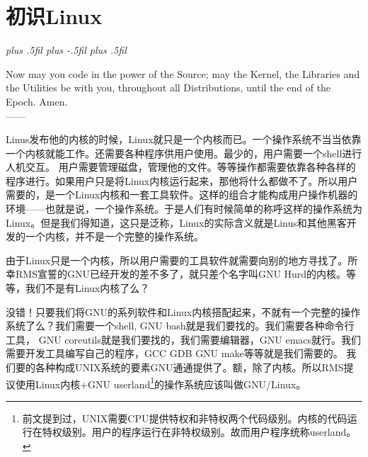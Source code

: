 \documentclass[amstex,twoside]{ctexbook}
\newcommand{\RTLpar}{%
  \leftskip=0pt plus .5fil%
  \rightskip=0pt plus -.5fil%
  \parfillskip=0pt plus .5fil%
}
\newenvironment{quotes}[2][0.55]{\pushQED{#2}%
\begin{flushright}%
\begin{minipage}{#1\textwidth}\begin{flushright}\noindent\it\RTLpar}{%
 \\------\popQED{}\end{flushright}\end{minipage}\end{flushright}\vskip 8mm }%
\begin{document}
{



}

\tableofcontents

\ifdefined\compileall
	
\else
	\addtocounter{chapter}{1}
\fi



\ifdefined\compileall

\else
\addtocounter{chapter}{1}
\fi 

\ifdefined\compileall

\else
\addtocounter{chapter}{1}
\fi 


\chapter{初识Linux}

\begin{quotes}[0.63]{The Gospel of Tux}
Now may you code in the power of the Source; may the Kernel, the Libraries and the Utilities be with you, throughout all Distributions, until the end of the Epoch. Amen. 
\end{quotes}

Linus发布他的内核的时候，Linux就只是一个内核而已。一个操作系统不当当依靠一个内核就能工作。还需要各种程序供用户使用。最少的，用户需要一个shell进行人机交互。
用户需要管理磁盘，管理他的文件。等等操作都需要依靠各种各样的程序进行。如果用户只是将Linux内核运行起来，那他将什么都做不了。所以用户需要的，是一个Linux内核和一套工具软件。这样的组合才能构成用户操作机器的环境——也就是说，一个操作系统。于是人们有时候简单的称呼这样的操作系统为Linux。但是我们得知道，这只是泛称，Linux的实际含义就是Linus和其他黑客开发的一个内核，并不是一个完整的操作系统。

由于Linux只是一个内核，所以用户需要的工具软件就需要向别的地方寻找了。所幸RMS宣誓的GNU已经开发的差不多了，就只差个名字叫GNU Hurd的内核。等等，我们不是有Linux内核了么？

没错！只要我们将GNU的系列软件和Linux内核搭配起来，不就有一个完整的操作系统了么？我们需要一个shell, GNU bash就是我们要找的。我们需要各种命令行工具， GNU coreutils就是我们要找的，我们需要编辑器，GNU emacs就行。我们需要开发工具编写自己的程序，GCC GDB GNU make等等就是我们需要的。 我们要的各种构成UNIX系统的要素GNU通通提供了。额，除了内核。所以RMS提议使用Linux内核+GNU userland\footnote{
前文提到过，UNIX需要CPU提供特权和非特权两个代码级别。内核的代码运行在特权级别。用户的程序运行在非特权级别。故而用户程序统称userland。}的操作系统应该叫做GNU/Linux。
\end{document}
